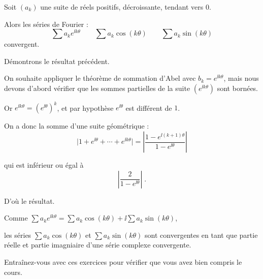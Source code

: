 \change
Soit $(a_k)$ une suite de réels positifs, décroissante,
tendant vers $0$. 

\change
Alors les séries de Fourier :
$$
\sum a_k e^{\ii k\theta} \qquad 
\sum a_k\cos(k\theta) \qquad 
\sum a_k\sin(k \theta)
$$
convergent.


\diapo

Démontrons le résultat précédent.

On souhaite appliquer le théorème de sommation d'Abel avec $b_k=e^{\ii k\theta}$, mais nous devons
d'abord vérifier que les sommes partielles de la suite $(e^{\ii k\theta})$ sont
bornées. 

\change
Or $e^{\ii k\theta}=(e^{\ii \theta})^k$, et par hypothèse 
$e^{\ii \theta}$ est différent de $1$. 

\change
On a donc la somme d'une suite géométrique :
$$
\big|1+e^{\ii \theta}+\cdots+e^{\ii k\theta}\big| =
 \left|\frac{1-e^{\ii (k+1)\theta}}{1-e^{\ii \theta}}\right|
 $$
 
\change
qui est inférieur ou égal à 
$$
\left|\frac{2}{1-e^{\ii \theta}}\right|\;.$$

\change
D'où le résultat. 

\change
Comme $\sum a_k e^{\ii k\theta} = \sum a_k\cos(k\theta) + \ii \sum a_k\sin(k \theta)$,

\change
les séries $\sum a_k\cos(k\theta)$ et $\sum a_k\sin(k \theta)$ sont convergentes en tant que partie réelle et partie imagniaire
d'une série complexe convergente.

\diapo

Entraînez-vous avec ces exercices pour vérifier que vous avez bien compris le cours.


